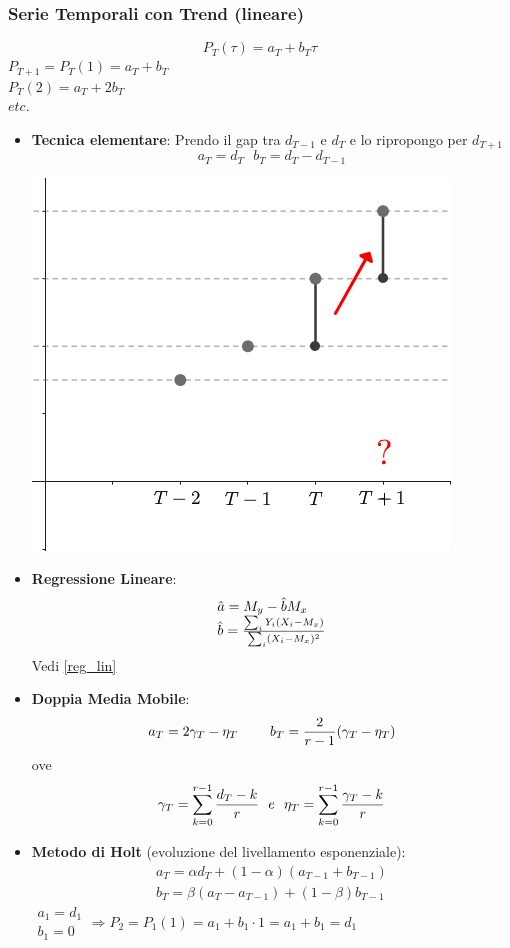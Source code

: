 \documentclass[12pt,a4paper]{article}
\begin{document}
\subsubsection{Serie Temporali con Trend (lineare)}
$$P_T(\tau) = a_T+b_T\tau$$
$P_{T+1} = P_T(1) = a_T + b_T$\\
$P_T(2) = a_T + 2b_T$\\
$etc.$
\begin{itemize}
\item \textbf{Tecnica elementare}: Prendo il gap tra $d_{T-1}$ e $d_T$ e lo ripropongo per $d_{T+1}$
$$a_T = d_T \ \ \ b_T = d_T - d_{T-1}$$
\begin{center}
\includegraphics[width=0.3\columnwidth]{img/trend_tecnica_elementare.png}\\
\end{center}
\item \textbf{Regressione Lineare}: $$\begin{array}{l}\hat a = M_y - \hat b M_x\\ \hat b = {\sum_i Y_i(X_i - M_x) \over \sum_i (X_i - M_x)^2}\end{array}$$Vedi \ref{reg_lin}
\item \textbf{Doppia Media Mobile}: $$a_T = 2 \gamma_T - \eta_T \ \ \ \ \ \ \ b_T = {2\over r-1}(\gamma_T - \eta_T)$$
ove $$\gamma_T = \sum_{k=0}^{r-1} {d_T - k \over r} \ \ e \ \ \eta_T = \sum_{k=0}^{r-1} {\gamma_T - k \over r}$$
\item \textbf{Metodo di Holt} (evoluzione del livellamento esponenziale): $$\begin{array}{l}a_T = \alpha d_T + (1-\alpha)(a_{T-1} + b_{T-1})\\b_T = \beta(a_T-a_{T-1})+(1-\beta)b_{T-1}\end{array}$$
$\begin{array}{l}a_1 = d_1\\b_1=0\end{array} \Rightarrow P_2 = P_1(1) = a_1 + b_1\cdot1 = a_1 + b_1 = d_1$

\end{itemize}
\end{document}
